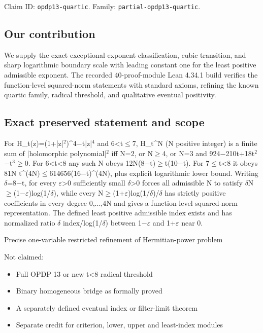 \documentclass[11pt,a4paper]{article}
\begin{document}
Claim ID: \texttt{opdp13-quartic}. Family: \texttt{partial-opdp13-quartic}.

\subsection{Our contribution}
We supply the exact exceptional-exponent classification, cubic transition, and sharp logarithmic boundary scale with leading constant one for the least positive admissible exponent. The recorded 40-proof-module Lean 4.34.1 build verifies the function-level squared-norm statements with standard axioms, refining the known quartic family, radical threshold, and qualitative eventual positivity.

\subsection{Exact preserved statement and scope}
For H\_t(z)=(1+|z|\ensuremath{^2})\textasciicircum{}4\ensuremath{-}t|z|\ensuremath{^4} and 6<t\ensuremath{\leq}7, H\_t\textasciicircum{}N (N positive integer) is a finite sum of |holomorphic polynomial|\ensuremath{^2} iff N=2, or N\ensuremath{\geq}4, or N=3 and 924\ensuremath{-}210t+18t\ensuremath{^2}\ensuremath{-}t\ensuremath{^3}\ensuremath{\geq}0. For 6<t<8 any such N obeys 12N(8\ensuremath{-}t)\ensuremath{\geq}t(10\ensuremath{-}t). For 7\ensuremath{\leq}t<8 it obeys 81N t\textasciicircum{}(4N)\ensuremath{\leq}614656(16\ensuremath{-}t)\textasciicircum{}(4N), plus explicit logarithmic lower bound. Writing \ensuremath{\delta}=8\ensuremath{-}t, for every \ensuremath{\varepsilon}>0 sufficiently small \ensuremath{\delta}>0 forces all admissible N to satisfy \ensuremath{\delta}N\ensuremath{\geq}(1\ensuremath{-}\ensuremath{\varepsilon})log(1/\ensuremath{\delta}), while every N\ensuremath{\geq}(1+\ensuremath{\varepsilon})log(1/\ensuremath{\delta})/\ensuremath{\delta} has strictly positive coefficients in every degree 0,...,4N and gives a function-level squared-norm representation. The defined least positive admissible index exists and has normalized ratio \ensuremath{\delta} index/log(1/\ensuremath{\delta}) between 1\ensuremath{-}\ensuremath{\varepsilon} and 1+\ensuremath{\varepsilon} near 0.

Precise one-variable restricted refinement of Hermitian-power problem

Not claimed:

\begin{itemize}
\item Full OPDP 13 or new t<8 radical threshold
\end{itemize}
\begin{itemize}
\item Binary homogeneous bridge as formally proved
\end{itemize}
\begin{itemize}
\item A separately defined eventual index or filter-limit theorem
\end{itemize}
\begin{itemize}
\item Separate credit for criterion, lower, upper and least-index modules
\end{itemize}
\end{document}
